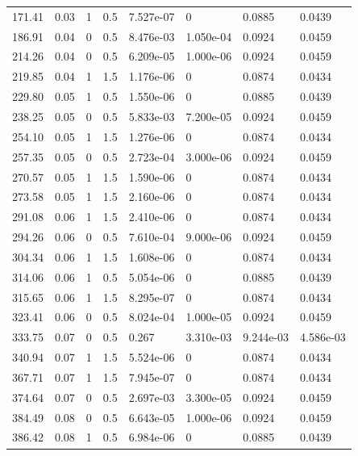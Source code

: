 \documentclass[preview]{standalone}
\begin{document}
{{\begin{tabular}{L{1.2cm}C{1.2cm} C{0.3cm}C{0.5cm} C{1.4cm}C{1.4cm} C{1.4cm}C{1.4cm}}
  171.41  &  0.03  & 1     & 0.5 &  7.527e-07  & 0  & 0.0885 &  0.0439   \\ 
  186.91  &  0.04  & 0     & 0.5 &  8.476e-03  & 1.050e-04  & 0.0924 &  0.0459   \\ 
  214.26  &  0.04  & 0     & 0.5 &  6.209e-05  & 1.000e-06  & 0.0924 &  0.0459   \\ 
  219.85  &  0.04  & 1     & 1.5 &  1.176e-06  & 0  & 0.0874 &  0.0434   \\ 
  229.80  &  0.05  & 1     & 0.5 &  1.550e-06  & 0  & 0.0885 &  0.0439   \\ 
  238.25  &  0.05  & 0     & 0.5 &  5.833e-03  & 7.200e-05  & 0.0924 &  0.0459   \\ 
  254.10  &  0.05  & 1     & 1.5 &  1.276e-06  & 0  & 0.0874 &  0.0434   \\ 
  257.35  &  0.05  & 0     & 0.5 &  2.723e-04  & 3.000e-06  & 0.0924 &  0.0459   \\ 
  270.57  &  0.05  & 1     & 1.5 &  1.590e-06  & 0  & 0.0874 &  0.0434   \\ 
  273.58  &  0.05  & 1     & 1.5 &  2.160e-06  & 0  & 0.0874 &  0.0434   \\ 
  291.08  &  0.06  & 1     & 1.5 &  2.410e-06  & 0  & 0.0874 &  0.0434   \\ 
  294.26  &  0.06  & 0     & 0.5 &  7.610e-04  & 9.000e-06  & 0.0924 &  0.0459   \\ 
  304.34  &  0.06  & 1     & 1.5 &  1.608e-06  & 0  & 0.0874 &  0.0434   \\ 
  314.06  &  0.06  & 1     & 0.5 &  5.054e-06  & 0  & 0.0885 &  0.0439   \\ 
  315.65  &  0.06  & 1     & 1.5 &  8.295e-07  & 0  & 0.0874 &  0.0434   \\ 
  323.41  &  0.06  & 0     & 0.5 &  8.024e-04  & 1.000e-05  & 0.0924 &  0.0459   \\ 
  333.75  &  0.07  & 0     & 0.5 &  0.267  & 3.310e-03  & 9.244e-03 &  4.586e-03   \\ 
  340.94  &  0.07  & 1     & 1.5 &  5.524e-06  & 0  & 0.0874 &  0.0434   \\ 
  367.71  &  0.07  & 1     & 1.5 &  7.945e-07  & 0  & 0.0874 &  0.0434   \\ 
  374.64  &  0.07  & 0     & 0.5 &  2.697e-03  & 3.300e-05  & 0.0924 &  0.0459   \\ 
  384.49  &  0.08  & 0     & 0.5 &  6.643e-05  & 1.000e-06  & 0.0924 &  0.0459   \\ 
  386.42  &  0.08  & 1     & 0.5 &  6.984e-06  & 0  & 0.0885 &  0.0439   \\ 

\end{tabular}}}
\end{document}
